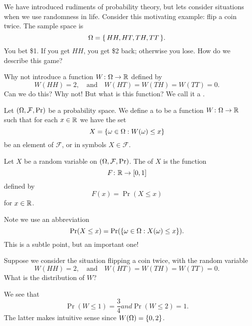 \M
We have introduced rudiments of probability theory, but lets consider
situations when we use randomness in life. Consider this motivating
example: flip a coin twice. The sample space is
\begin{equation}
\Omega=\{\,HH,HT,TH,TT\,\}.
\end{equation}
You bet \$1. If you get $HH$, you get \$2 back; otherwise you lose. How
do we describe this game?

Why not introduce a function $W\colon\Omega\to\mathbb{R}$ defined by
\begin{equation}
W(HH)=2,\quad\mbox{and}\quad W(HT)=W(TH)=W(TT)=0.
\end{equation}
Can we do this? Why not! But what is this function? We call it a
.

Let $(\Omega,\mathcal{F},\mathop{\mathrm{Pr}}\nolimits)$ be a probability space. We define a
 to be a function $W\colon\Omega\to\mathbb{R}$
such that for each $x\in\mathbb{R}$ we have the set
\begin{equation}
X = \{ \omega\in\Omega : W(\omega)\leq x\}
\end{equation}
be an element of $\mathcal{F}$, or in symbols $X\in\mathcal{F}$. 

Let $X$ be a random variable on $(\Omega,\mathcal{F},\mathop{\mathrm{Pr}}\nolimits)$. The
 of $X$ is the function
\begin{equation}
F\colon\mathbb{R}\to[0,1]
\end{equation}
defined by
\begin{equation}
F(x)=\Pr(X\leq x)
\end{equation}
for $x\in\mathbb{R}$.

Note we use an abbreviation
\begin{equation}
\mathop{\mathrm{Pr}}\nolimits(X\leq x)=\mathop{\mathrm{Pr}}\nolimits(\{\omega\in\Omega : X(\omega)\leq x\}).
\end{equation}
This is a subtle point, but an important one!

Suppose we consider the situation flipping a coin twice, with the random
variable
\begin{equation}
W(HH)=2,\quad\mbox{and}\quad W(HT)=W(TH)=W(TT)=0.
\end{equation}
What is the distribution of $W$?

We see that
\begin{subequations}
\begin{equation}
\Pr(W\leq 1)=\frac{3}{4}
\end{equation}
and
\begin{equation}
\Pr(W\leq2)=1.
\end{equation}
\end{subequations}
The latter makes intuitive sense since $W(\Omega)=\{0,2\}$. 

